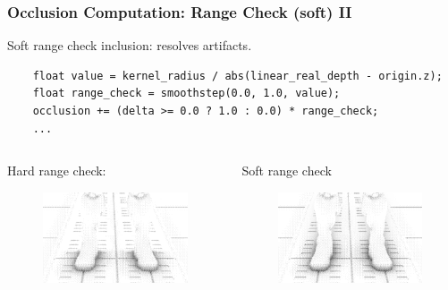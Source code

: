 \documentclass{beamer}
\begin{document}
\begin{frame}[fragile]
\frametitle{Occlusion Computation: Range Check (soft) II}
Soft range check inclusion: resolves artifacts.
\begin{verbatim}
    float value = kernel_radius / abs(linear_real_depth - origin.z);
    float range_check = smoothstep(0.0, 1.0, value);
    occlusion += (delta >= 0.0 ? 1.0 : 0.0) * range_check;
    ...
\end{verbatim}

\begin{columns}
    \begin{column}{0.45\linewidth}
    \centering
        Hard range check:
        \begin{figure}
            \centering
            \vspace{-1.8ex}%
            \includegraphics[width=0.8\linewidth]{images/feet_hard_range_check.png}
        \end{figure}
    \end{column}

    \begin{column}{0.45\linewidth}
        \centering
        Soft range check
        \begin{figure}
            \centering
            \vspace{-1.8ex}%
            \includegraphics[width=0.8\linewidth]{images/feet_soft_range_check.png}
        \end{figure}
    \end{column}
\end{columns}

\end{frame}
\end{document}
